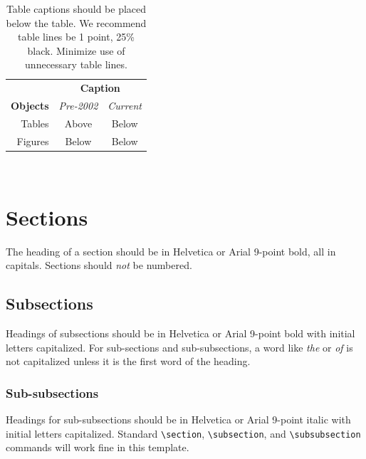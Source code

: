 \documentclass{sigchi}
\begin{document}

\begin{table}
  \centering
  \begin{tabular}{r c c}
    \toprule
    & \multicolumn{2}{c}{\small{\textbf{Caption}}} \\
    \cmidrule(r){2-3}
    {\small\textbf{Objects}}
    & {\small \textit{Pre-2002}}
    & {\small \textit{Current}} \\
    \midrule
    Tables & Above & Below \\
    Figures & Below & Below \\
    \bottomrule
  \end{tabular}
  \caption{Table captions should be placed below the table. We
    recommend table lines be 1 point, 25\% black. Minimize use of
    unnecessary table lines.}~\label{tab:table1}
\end{table}

\section{Sections}

The heading of a section should be in Helvetica or Arial 9-point bold,
all in capitals. Sections should \textit{not} be numbered.

\subsection{Subsections}

Headings of subsections should be in Helvetica or Arial 9-point bold
with initial letters capitalized.  For sub-sections and
sub-subsections, a word like \emph{the} or \emph{of} is not
capitalized unless it is the first word of the heading.

\subsubsection{Sub-subsections}

Headings for sub-subsections should be in Helvetica or Arial 9-point
italic with initial letters capitalized.  Standard
\texttt{{\textbackslash}section}, \texttt{{\textbackslash}subsection},
and \texttt{{\textbackslash}subsubsection} commands will work fine in
this template.
\end{document}
